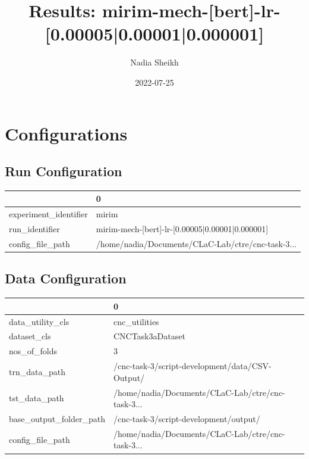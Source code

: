 \documentclass{article}
\title{Results: mirim-mech-[bert]-lr-[0.00005|0.00001|0.000001]}
\author{Nadia Sheikh}
\date{2022-07-25}
\begin{document}
\maketitle
\section{Configurations}
\subsection{Run Configuration}
\begin{tabular}{ll}
\toprule
{} &                                                  0 \\
\midrule
experiment\_identifier &                                              mirim \\
run\_identifier        &    mirim-mech-[bert]-lr-[0.00005|0.00001|0.000001] \\
config\_file\_path      &  /home/nadia/Documents/CLaC-Lab/ctre/cnc-task-3... \\
\bottomrule
\end{tabular}

\subsection{Data Configuration}
\begin{tabular}{ll}
\toprule
{} &                                                  0 \\
\midrule
data\_utility\_cls        &                                      cnc\_utilities \\
dataset\_cls             &                                   CNCTask3aDataset \\
nos\_of\_folds            &                                                  3 \\
trn\_data\_path           &    /cnc-task-3/script-development/data/CSV-Output/ \\
tst\_data\_path           &  /home/nadia/Documents/CLaC-Lab/ctre/cnc-task-3... \\
base\_output\_folder\_path &             /cnc-task-3/script-development/output/ \\
config\_file\_path        &  /home/nadia/Documents/CLaC-Lab/ctre/cnc-task-3... \\
\bottomrule
\end{tabular}
\end{document}
